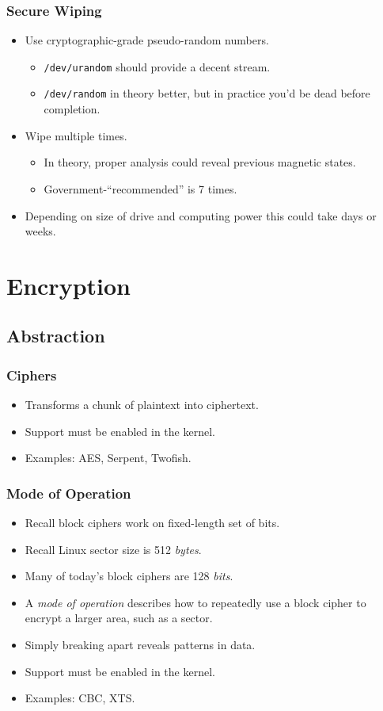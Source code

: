 \documentclass[xcolor={dvipsnames,svgnames},hyperref=dvips]{beamer}
\begin{document}
	\begin{frame}
		\frametitle{Secure Wiping}
		\begin{itemize}
		\item Use cryptographic-grade pseudo-random numbers.
			\begin{itemize}
			\item \texttt{/dev/urandom} should provide a decent stream.
			\item \texttt{/dev/random} in theory better, but in practice you'd be dead before completion.
			\end{itemize}
		\item Wipe multiple times.
			\begin{itemize}
			\item In theory, proper analysis could reveal previous magnetic states.
			\item Government-``recommended'' is 7 times.
			\end{itemize}
		\item Depending on size of drive and computing power this could take days or weeks.
		\end{itemize}
	\end{frame}

\section{Encryption}\label{section:encryption}
	\subsection{Abstraction}
	\begin{frame}
		\frametitle{Ciphers}
		\begin{itemize}
		\item Transforms a chunk of plaintext into ciphertext.
		\item Support must be enabled in the kernel.
		\item Examples: AES, Serpent, Twofish.
		\end{itemize}
	\end{frame}

	\begin{frame}
		\frametitle{Mode of Operation}
		\begin{itemize}
		\item Recall block ciphers work on fixed-length set of bits.
		\item Recall Linux sector size is 512 \textit{bytes}.
		\item Many of today's block ciphers are 128 \textit{bits}.
		\item A \textit{mode of operation} describes how to repeatedly use a block cipher to encrypt a larger area, such as a sector.
		\item Simply breaking apart reveals patterns in data.
		\item Support must be enabled in the kernel.
		\item Examples: CBC, XTS.
		\end{itemize}
	\end{frame}
\end{document}
